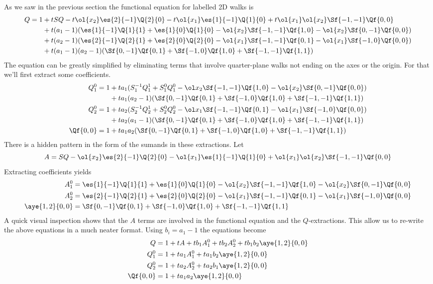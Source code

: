 As we saw in the previous section the functional equation for labelled 2D walks is
\begin{align*}
Q = 1 &+ tSQ - t \ol{x_2}\es{2}{-1}\Q{2}{0} - t\ol{x_1}\es{1}{-1}\Q{1}{0}+t\ol{x_1}\ol{x_2}\Sf{-1,-1}\Qf{0,0}\\
	&+ t(a_1-1)(\es{1}{-1}\Q{1}{1}+\es{1}{0}\Q{1}{0}-\ol{x_2}\Sf{-1,-1}\Qf{1,0}-\ol{x_2}\Sf{0,-1}\Qf{0,0})\\
	&+ t(a_2-1)(\es{2}{-1}\Q{2}{1}+\es{2}{0}\Q{2}{0}-\ol{x_1}\Sf{-1,-1}\Qf{0,1}-\ol{x_1}\Sf{-1,0}\Qf{0,0})\\
	&+t(a_1-1)(a_2-1)(\Sf{0,-1}\Qf{0,1}+\Sf{-1,0}\Qf{1,0}+\Sf{-1,-1}\Qf{1,1})
\end{align*}
The equation can be greatly simplified by eliminating terms that involve quarter-plane walks not ending on the axes or the origin. For that we'll first extract some coefficients.
\begin{align*}
Q_1^0 = 1 &+  t a_1 (S_1^{-1}Q_1^1+S_1^0 Q_1^0-\ol x_2 \Sf{-1,-1}\Qf{1,0}-\ol{x_2}\Sf{0,-1}\Qf{0,0})\\
                   &+ta_1 (a_2-1)(\Sf{0,-1}\Qf{0,1}+\Sf{-1,0}\Qf{1,0}+\Sf{-1,-1}\Qf{1,1})\\
Q_2^0 = 1 &+  t a_2 (S_2^{-1}Q_2^1+S_2^0 Q_2^0-\ol x_1 \Sf{-1,-1}\Qf{0,1}-\ol{x_1}\Sf{-1,0}\Qf{0,0})\\
                   &+ta_2 (a_1-1)(\Sf{0,-1}\Qf{0,1}+\Sf{-1,0}\Qf{1,0}+\Sf{-1,-1}\Qf{1,1})\\
\Qf{0,0} = 1 &+  t a_1 a_2 (\Sf{0,-1}\Qf{0,1}+\Sf{-1,0}\Qf{1,0}+\Sf{-1,-1}\Qf{1,1})
\end{align*}
There is a hidden pattern in the form of the sumands in these extractions. Let
\[
      A = SQ -  \ol{x_2}\es{2}{-1}\Q{2}{0} -\ol{x_1}\es{1}{-1}\Q{1}{0}+\ol{x_1}\ol{x_2}\Sf{-1,-1}\Qf{0,0}
\]
Extracting coefficients yields
\begin{align*}
A_1^0 &= \es{1}{-1}\Q{1}{1}+\es{1}{0}\Q{1}{0}-\ol{x_2}\Sf{-1,-1}\Qf{1,0}-\ol{x_2}\Sf{0,-1}\Qf{0,0}\\
A_2^0 &= \es{2}{-1}\Q{2}{1}+\es{2}{0}\Q{2}{0}-\ol{x_1}\Sf{-1,-1}\Qf{0,1}-\ol{x_1}\Sf{-1,0}\Qf{0,0}\\
\aye{1,2}{0,0} &= \Sf{0,-1}\Qf{0,1}+\Sf{-1,0}\Qf{1,0}+\Sf{-1,-1}\Qf{1,1}
\end{align*}
A quick visual inspection shows that the $A$ terms are involved in the functional equation and the $Q$-extractions. This allow us to re-write the above equations in a much neater format. Using $b_i = a_1 - 1$ the equations become
\begin{align*}
Q &= 1+ tA + tb_1A_1^0+tb_2 A_2^0 + tb_1b_2 \aye{1,2}{0,0}\\
Q_1^0 & = 1+t a_1 A_1^0 + ta_1b_2 \aye{1,2}{0,0}\\
Q_2^0 & = 1+t a_2 A_2^0 + ta_2b_1 \aye{1,2}{0,0}\\
\Qf{0,0} &= 1+ t a_1a_2 \aye{1,2}{0,0}
\end{align*}
